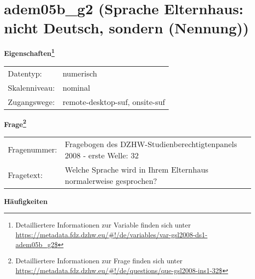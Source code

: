 
    \setcounter{footnote}{0}

    \vspace*{-1.8cm}
	\section{adem05b\_g2 (Sprache Elternhaus: nicht Deutsch, sondern (Nennung))}
	\label{section:adem05b_g2}



    \vspace*{0.5cm}
    \noindent\textbf{Eigenschaften\footnote{Detailliertere Informationen zur Variable finden sich unter
		\url{https://metadata.fdz.dzhw.eu/\#!/de/variables/var-gsl2008-ds1-adem05b_g2$}}}\\
	\begin{tabularx}{\hsize}{@{}lX}
	Datentyp: & numerisch \\
	Skalenniveau: & nominal \\
	Zugangswege: &
	  remote-desktop-suf, 
	  onsite-suf
 \\
    \end{tabularx}



				\vspace*{0.5cm}
                \noindent\textbf{Frage\footnote{Detailliertere Informationen zur Frage finden sich unter
		              \url{https://metadata.fdz.dzhw.eu/\#!/de/questions/que-gsl2008-ins1-32$}}}\\
				\begin{tabularx}{\hsize}{@{}lX}
					Fragenummer: &
					  Fragebogen des DZHW-Studienberechtigtenpanels 2008 - erste Welle:
					  32
 \\
					Fragetext: & Welche Sprache wird in Ihrem Elternhaus normalerweise gesprochen? \\
				\end{tabularx}





        		\vspace*{0.5cm}
                \noindent\textbf{Häufigkeiten}

